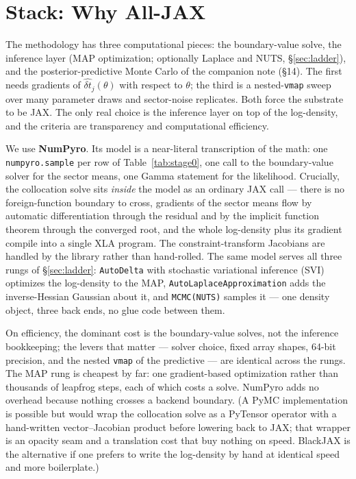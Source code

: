 \documentclass[11pt]{article}
\newcommand{\dt}{\widehat{\delta t}}
\begin{document}
\section{Stack: Why All-JAX}

The methodology has three computational pieces: the boundary-value solve, the inference layer (MAP optimization; optionally Laplace and NUTS, \S\ref{sec:ladder}), and the posterior-predictive Monte Carlo of the companion note (\S14). The first needs gradients of $\dt_j(\theta)$ with respect to $\theta$; the third is a nested-\texttt{vmap} sweep over many parameter draws and sector-noise replicates. Both force the substrate to be JAX. The only real choice is the inference layer on top of the log-density, and the criteria are transparency and computational efficiency.

We use \textbf{NumPyro}. Its model is a near-literal transcription of the math: one \texttt{numpyro.sample} per row of Table~\ref{tab:stage0}, one call to the boundary-value solver for the sector means, one Gamma statement for the likelihood. Crucially, the collocation solve sits \emph{inside} the model as an ordinary JAX call --- there is no foreign-function boundary to cross, gradients of the sector means flow by automatic differentiation through the residual and by the implicit function theorem through the converged root, and the whole log-density plus its gradient compile into a single XLA program. The constraint-transform Jacobians are handled by the library rather than hand-rolled. The same model serves all three rungs of \S\ref{sec:ladder}: \texttt{AutoDelta} with stochastic variational inference (SVI) optimizes the log-density to the MAP, \texttt{AutoLaplaceApproximation} adds the inverse-Hessian Gaussian about it, and \texttt{MCMC(NUTS)} samples it --- one density object, three back ends, no glue code between them.

On efficiency, the dominant cost is the boundary-value solves, not the inference bookkeeping; the levers that matter --- solver choice, fixed array shapes, 64-bit precision, and the nested \texttt{vmap} of the predictive --- are identical across the rungs. The MAP rung is cheapest by far: one gradient-based optimization rather than thousands of leapfrog steps, each of which costs a solve. NumPyro adds no overhead because nothing crosses a backend boundary. (A PyMC implementation is possible but would wrap the collocation solve as a PyTensor operator with a hand-written vector--Jacobian product before lowering back to JAX; that wrapper is an opacity seam and a translation cost that buy nothing on speed. BlackJAX is the alternative if one prefers to write the log-density by hand at identical speed and more boilerplate.)
\end{document}
